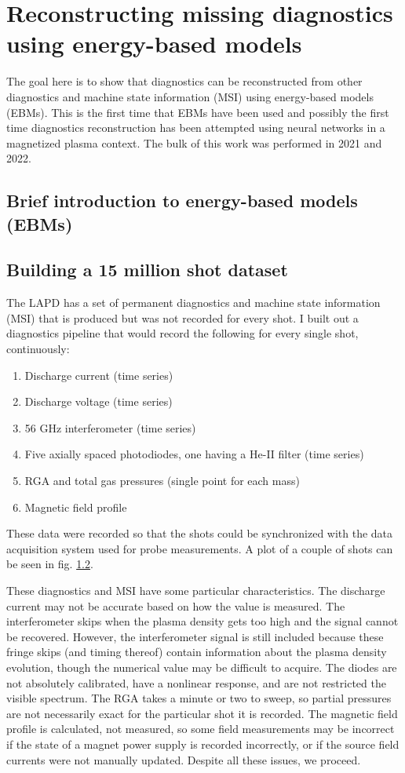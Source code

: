 \graphicspath{{Chapters/Chapter_ebm/}}

\chapter{Reconstructing missing diagnostics using energy-based models}

The goal here is to show that diagnostics can be reconstructed from other diagnostics and machine state information (MSI) using energy-based models (EBMs). This is the first time that EBMs have been used and possibly the first time diagnostics reconstruction has been attempted using neural networks in a magnetized plasma context. The bulk of this work was performed in 2021 and 2022.  

\section{Brief introduction to energy-based models (EBMs)}

\section{Building a 15 million shot dataset}

The LAPD has a set of permanent diagnostics and machine state information (MSI) that is produced but was not recorded for every shot. I built out a diagnostics pipeline that would record the following for every single shot, continuously:
\begin{enumerate}
	\item Discharge current (time series)
	\item Discharge voltage (time series)
	\item 56 GHz interferometer (time series)
	\item Five axially spaced photodiodes, one having a He-II filter (time series)
	\item RGA and total gas pressures (single point for each mass)
	\item Magnetic field profile
\end{enumerate}
These data were recorded so that the shots could be synchronized with the data acquisition system used for probe measurements. A plot of a couple of shots can be seen in fig. \ref{}.

These diagnostics and MSI have some particular characteristics. The discharge current may not be accurate based on how the value is measured. The interferometer skips when the plasma density gets too high and the signal cannot be recovered. However, the interferometer signal is still included because these fringe skips (and timing thereof) contain information about the plasma density evolution, though the numerical value may be difficult to acquire. The diodes are not absolutely calibrated, have a nonlinear response, and are not restricted the visible spectrum. The RGA takes a minute or two to sweep, so partial pressures are not necessarily exact for the particular shot it is recorded. The magnetic field profile is calculated, not measured, so some field measurements may be incorrect if the state of a magnet power supply is recorded incorrectly, or if the source field currents were not manually updated. Despite all these issues, we proceed.


